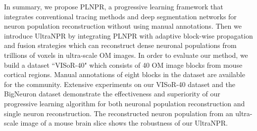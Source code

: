 In summary, we propose PLNPR, a progressive learning framework that integrates conventional tracing methods and deep segmentation networks for neuron population reconstruction without using manual annotations.
%
Then we introduce UltraNPR by integrating PLNPR with adaptive block-wise propagation and fusion strategies which can reconstruct dense neuronal populations from trillions of voxels in ultra-scale OM images. 
%
In order to evaluate our method, we build a dataset ``VISoR-40" which consists of 40 OM image blocks from mouse cortical regions. Manual annotations of eight blocks in the dataset are available for the community. Extensive experiments on our VISoR-40 dataset and the BigNeuron dataset demonstrate the effectiveness and superiority of our progressive learning algorithm for both neuronal population reconstruction and single neuron reconstruction.
The reconstructed neuron population from an ultra-scale image of a mouse brain slice shows the robustness of our UltraNPR.





